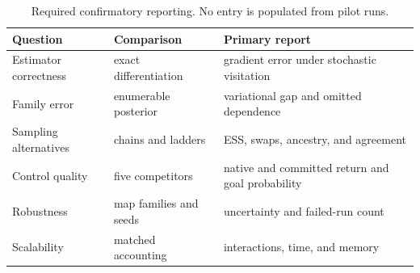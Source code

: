 \begin{table}[t]
  \centering
  \caption{Required confirmatory reporting.  No entry is populated from pilot
  runs.}
  \label{tab:result-matrix}
  \begin{tabular}{@{}p{25mm}p{42mm}p{55mm}@{}}
    \toprule
    Question & Comparison & Primary report \\
    \midrule
    Estimator correctness & exact differentiation & gradient error under stochastic visitation \\
    Family error & enumerable posterior & variational gap and omitted dependence \\
    Sampling alternatives & chains and ladders & ESS, swaps, ancestry, and agreement \\
    Control quality & five competitors & native and committed return and goal probability \\
    Robustness & map families and seeds & uncertainty and failed-run count \\
    Scalability & matched accounting & interactions, time, and memory \\
    \bottomrule
  \end{tabular}
\end{table}
